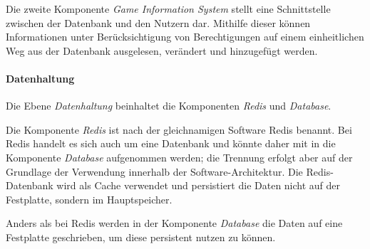 Die zweite Komponente \textit{Game Information System} stellt eine Schnittstelle zwischen der Datenbank und den Nutzern dar. Mithilfe dieser können Informationen unter Berücksichtigung von Berechtigungen auf einem einheitlichen Weg aus der Datenbank ausgelesen, verändert und hinzugefügt werden. 

\paragraph{Datenhaltung}
Die Ebene \textit{Datenhaltung} beinhaltet die Komponenten \textit{Redis} und \linebreak \textit{Database}. 

Die Komponente \textit{Redis} ist nach der gleichnamigen Software Redis benannt. Bei Redis handelt es sich auch um eine Datenbank und könnte daher mit in die Komponente \textit{Database} aufgenommen werden; die Trennung erfolgt aber auf der Grundlage der Verwendung innerhalb der Software-Architektur. Die Redis-Datenbank wird als Cache verwendet und persistiert die Daten nicht auf der Festplatte, sondern im Hauptspeicher.

Anders als bei Redis werden in der Komponente \textit{Database} die Daten auf eine Festplatte geschrieben, um diese persistent nutzen zu können.